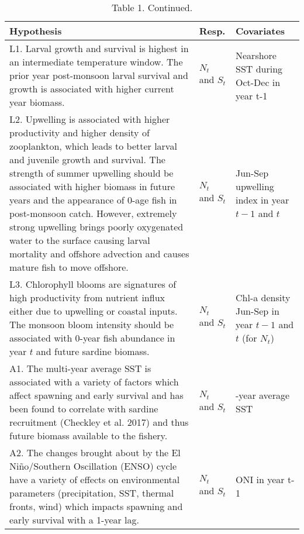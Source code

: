 \begin{table}[t]

\caption{\label{tab:unnamed-chunk-2}Table 1. Continued.}
\centering
\begin{tabular}{>{\raggedright\arraybackslash}p{10.5cm}|>{\raggedright\arraybackslash}p{1cm}|>{\raggedright\arraybackslash}p{3cm}}
\hline
Hypothesis & Resp. & Covariates\\
\hline
L1.  Larval growth and survival is highest in an intermediate temperature window. The prior year post-monsoon larval survival and growth is associated with higher current year biomass. & $N_t$ and $S_t$ & Nearshore SST during Oct-Dec in year t-1\\
\hline
L2. Upwelling is associated with higher productivity and higher density of zooplankton, which leads to better larval and juvenile growth and survival.  The strength of summer upwelling should be associated with higher biomass in future years and the appearance of 0-age fish in post-monsoon catch. However, extremely strong upwelling brings poorly oxygenated water to the surface causing larval mortality and offshore advection and causes mature fish to move offshore. & $N_t$ and $S_t$ & Jun-Sep upwelling index in year $t-1$ and $t$\\
\hline
L3. Chlorophyll blooms are signatures of high productivity from nutrient influx either due to upwelling or coastal inputs.  The monsoon bloom intensity should be associated with 0-year fish abundance in year $t$ and future sardine biomass. & $N_t$ and $S_t$ & Chl-a density Jun-Sep in year $t-1$ and $t$ (for $N_t$)\\
\hline
A1. The multi-year average SST is associated with a variety of factors which affect spawning and early survival and has been found to correlate with sardine recruitment (Checkley et al. 2017) and thus future biomass available to the fishery. & $N_t$ and $S_t$ & 3-year average SST\\
\hline
A2. The changes brought about by the El Niño/Southern Oscillation (ENSO) cycle have a variety of effects on environmental parameters (precipitation, SST, thermal fronts, wind) which impacts spawning and early survival with a 1-year lag. & $N_t$ and $S_t$ & ONI in year t-1\\
\hline
\end{tabular}
\end{table}
